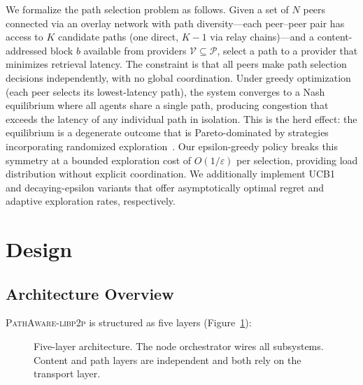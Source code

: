 \documentclass[sigconf,nonacm]{acmart}
\begin{document}
We formalize the path selection problem as follows. Given a set of $N$ peers connected via an overlay network with path diversity---each peer--peer pair has access to $K$ candidate paths (one direct, $K-1$ via relay chains)---and a content-addressed block $b$ available from providers $\mathcal{V} \subseteq \mathcal{P}$, select a path to a provider that minimizes retrieval latency. The constraint is that all peers make path selection decisions independently, with no global coordination. Under greedy optimization (each peer selects its lowest-latency path), the system converges to a Nash equilibrium where all agents share a single path, producing congestion that exceeds the latency of any individual path in isolation. This is the herd effect: the equilibrium is a degenerate outcome that is Pareto-dominated by strategies incorporating randomized exploration~\cite{pathselection2025}. Our epsilon-greedy policy breaks this symmetry at a bounded exploration cost of $O(1/\varepsilon)$ per selection, providing load distribution without explicit coordination. We additionally implement UCB1~\cite{auer2002bandit} and decaying-epsilon variants that offer asymptotically optimal regret and adaptive exploration rates, respectively.

\section{Design}
\label{sec:design}

\subsection{Architecture Overview}

\textsc{PathAware-libp2p} is structured as five layers (Figure~\ref{fig:architecture}):

\begin{figure}[t]
\centering
{}
\caption{Five-layer architecture. The node orchestrator wires all subsystems. Content and path layers are independent and both rely on the transport layer.}
\label{fig:architecture}
\end{figure}
\end{document}
